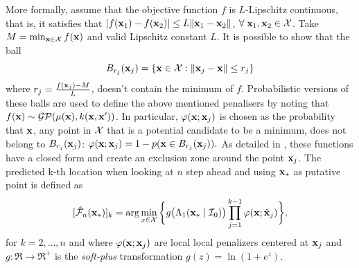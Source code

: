 \documentclass[twoside]{article}
\newcommand{\I}{\mathcal{I}}
\newcommand{\GP}{\mathcal{GP}}
\newcommand{\future}{\mathcal{F}}
\begin{document}
More formally, assume that the objective function $f$ is $L$-Lipschitz continuous, that is, it satisfies that $|f(\mathbf{x}_1) - f(\mathbf{x}_2) | \leq L \|\mathbf{x}_1 -\mathbf{x}_2 \|$, $\forall\; \mathbf{x}_1,\mathbf{x}_2\in\mathcal{X}$. Take $M = \min_{\mathbf{x} \in {\mathcal{X}}} f(\mathbf{x})$ and valid Lipschitz constant $L$. It is possible to show that  the ball
\begin{equation}\label{eq:radious}
B_{r_j}(\mathbf{x}_j)= \{\mathbf{x}\in \mathcal{X} : \|\mathbf{x}_j-\mathbf{x} \| \leq r_j \}
\end{equation}
where $r_j = \frac{f(\mathbf{x}_j)-M}{L}$, doesn't contain the minimum of $f$. Probabilistic versions of these balls are used to define the above mentioned penalisers by noting that $\latentForce(\latentVector) \sim \GP(\mu(\latentVector),k(\latentVector,\latentVector'))$. In particular, $\varphi(\mathbf{x};\mathbf{x}_j)$ is chosen as the probability that $\mathbf{x}$, any point in $\mathcal{X}$ that is a potential candidate to be a minimum, does not belong to $B_{r_j}(\mathbf{x}_j)$: $\varphi(\mathbf{x};\mathbf{x}_j)  = 1- p (\mathbf{x}  \in B_{r_j}(\mathbf{x}_j)).$
As detailed in \cite{gonzalez2015batch}, these functions have a closed form and create an exclusion zone around the point $\mathbf{x}_j$. The predicted k-th location when looking at $n$ step ahead and using $\mathbf{x}_*$ as putative point is defined as
\begin{equation}\label{eq:penalized_acquisition}
 [\hat{\future}_n(\latentVector_*)]_k  =
 \arg \min_{x \in \inputSpace}\, \biggl\{g \bigl(\Lambda_1(\latentVector_* \mid \I_0) \bigr)\prod_{j=1}^{k-1}\varphi(\latentVector;\hat{\latentVector}_{j})\biggr\},
\end{equation}
for $k=2,\dots,n$ and where $\varphi(\mathbf{x};\mathbf{x}_{j})$ are local local penalizers centered at $\mathbf{x}_{j}$ and $g:\Re \rightarrow \Re^+$ is the \emph{soft-plus} transformation $g(z)= \ln(1+e^z)$.
\end{document}
